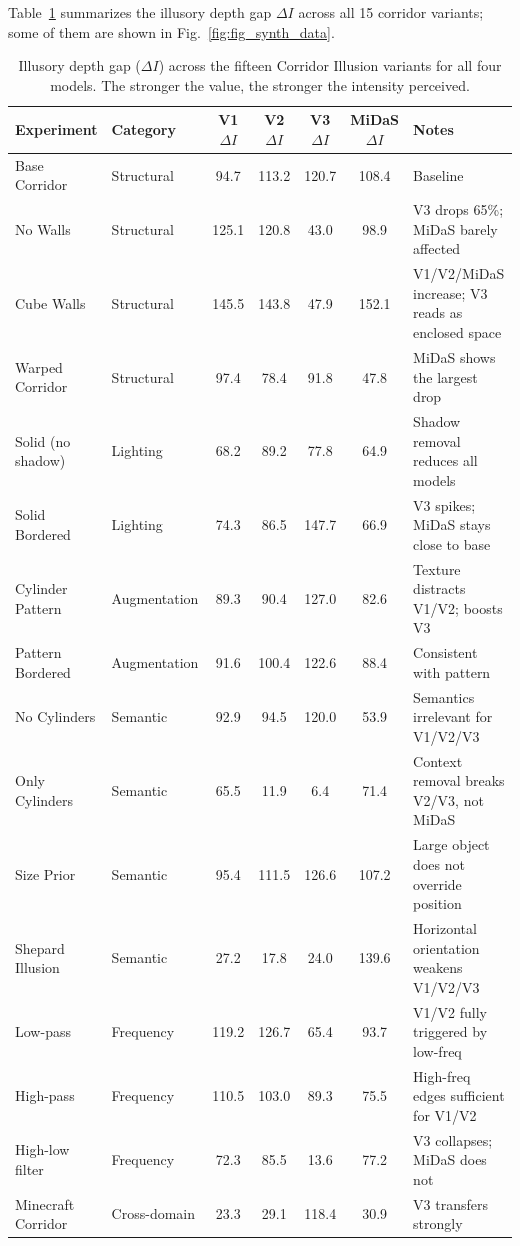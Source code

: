 \documentclass[10pt,twocolumn]{article}
\begin{document}
Table~\ref{tab:corridor} summarizes the illusory depth gap $\Delta I$ across all 15
corridor variants; some of them are shown in Fig.~\ref{fig:fig_synth_data}. 
\begin{table}[t]
\centering
\caption{Illusory depth gap ($\Delta I$) across the fifteen Corridor Illusion variants for
all four models.  The stronger the value, the stronger the intensity perceived.}
\label{tab:corridor}
\small
\setlength{\tabcolsep}{0pt} %
\begin{tabular*}{\textwidth}{@{\extracolsep{\fill}}llccccl@{}} %
\toprule
\textbf{Experiment} & \textbf{Category} & \textbf{V1 $\Delta I$} & \textbf{V2 $\Delta I$} & \textbf{V3 $\Delta I$} & \textbf{MiDaS $\Delta I$} & \textbf{Notes} \\
\midrule
Base Corridor        & Structural   & 94.7  & 113.2 & 120.7 & 108.4 & Baseline \\
No Walls             & Structural   & 125.1 & 120.8 &  43.0 &  98.9 & V3 drops 65\%; MiDaS barely affected \\
Cube Walls           & Structural   & 145.5 & 143.8 &  47.9 & 152.1 & V1/V2/MiDaS increase; V3 reads as enclosed space \\
Warped Corridor      & Structural   &  97.4 &  78.4 &  91.8 &  47.8 & MiDaS shows the largest drop \\
Solid (no shadow)    & Lighting     &  68.2 &  89.2 &  77.8 &  64.9 & Shadow removal reduces all models \\
Solid Bordered       & Lighting     &  74.3 &  86.5 & 147.7 &  66.9 & V3 spikes; MiDaS stays close to base \\
Cylinder Pattern     & Augmentation &  89.3 &  90.4 & 127.0 &  82.6 & Texture distracts V1/V2; boosts V3 \\
Pattern Bordered     & Augmentation &  91.6 & 100.4 & 122.6 &  88.4 & Consistent with pattern \\
No Cylinders & Semantic     &  92.9 &  94.5 & 120.0 &  53.9 & Semantics irrelevant for V1/V2/V3 \\
Only Cylinders       & Semantic     &  65.5 &  11.9 &   6.4 &  71.4 & Context removal breaks V2/V3, not MiDaS \\
Size Prior           & Semantic     &  95.4 & 111.5 & 126.6 & 107.2 & Large object does not override position \\
Shepard Illusion     & Semantic     &  27.2 &  17.8 &  24.0 & 139.6 & Horizontal orientation weakens V1/V2/V3 \\
Low-pass             & Frequency    & 119.2 & 126.7 &  65.4 &  93.7 & V1/V2 fully triggered by low-freq \\
High-pass            & Frequency    & 110.5 & 103.0 &  89.3 &  75.5 & High-freq edges sufficient for V1/V2 \\
High-low filter      & Frequency    &  72.3 &  85.5 &  13.6 &  77.2 & V3 collapses; MiDaS does not \\
\midrule
Minecraft Corridor   & Cross-domain &  23.3 &  29.1 & 118.4 &  30.9 & V3 transfers strongly \\
\bottomrule
\end{tabular*}
\end{table}
\end{document}
